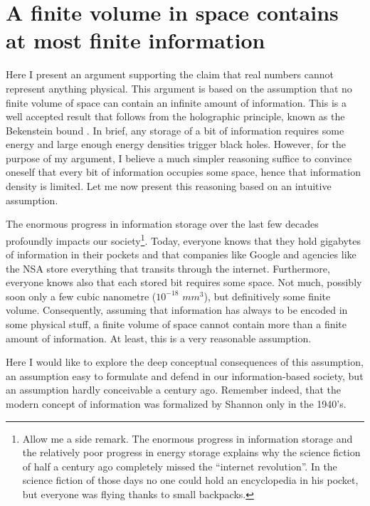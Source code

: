 \documentclass[floatfix,12pt]{article}
\begin{document}
\section{A finite volume in space contains at most finite information}\label{finiteInfo}
Here I present an argument supporting the claim that real numbers cannot represent anything physical. This argument is based on the assumption that no finite volume of space can contain an infinite amount of information. This is a well accepted result that follows from the holographic principle, known as the Bekenstein bound \cite{HoloPrinciple,BekensteinBound}. In brief, any storage of a bit of information requires some energy and large enough energy densities trigger black holes. However, for the purpose of my argument, I believe a much simpler reasoning suffice to convince oneself that every bit of information occupies some space, hence that information density is limited. Let me now present this reasoning based on an intuitive assumption.

The enormous progress in information storage over the last few decades profoundly impacts our society\footnote{Allow me a side remark. The enormous progress in information storage and the relatively poor progress in energy storage explains why the science fiction of half a century ago completely missed the ``internet revolution''. In the science fiction of those days no one could hold an encyclopedia in his pocket, but everyone was flying thanks to small backpacks.}. Today, everyone knows that they hold gigabytes of information in their pockets and that companies like Google and agencies like the NSA store everything that transits through the internet. Furthermore, everyone knows also that each stored bit requires some space. Not much, possibly soon only a few cubic nanometre ($10^{-18}$ $mm^3$), but definitively some finite volume. Consequently, assuming that information has always to be encoded in some physical stuff, a finite volume of space cannot contain more than a finite amount of information. At least, this is a very reasonable assumption.

Here I would like to explore the deep conceptual consequences of this assumption, an assumption easy to formulate and defend in our information-based society, but an assumption hardly conceivable a century ago. Remember indeed, that the modern concept of information was formalized by Shannon only in the 1940's.%
\end{document}

